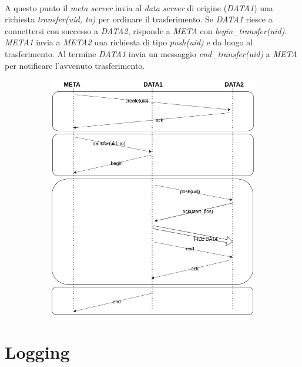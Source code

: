 \documentclass{article}
\begin{document}
\paragraph{} A questo punto il \emph{meta server} invia al \emph{data server} di origine (\emph{DATA1}) una richiesta \emph{transfer(uid, to)} per ordinare il trasferimento. Se \emph{DATA1} riesce a connettersi con successo a \emph{DATA2}, risponde a \emph{META} con \emph{begin\_transfer(uid)}. \emph{META1} invia a \emph{META2} una richiesta di tipo \emph{push(uid)} e da luogo al trasferimento. Al termine \emph{DATA1} invia un messaggio \emph{end\_transfer(uid)} a \emph{META} per notificare l'avvenuto trasferimento.


\begin{figure}[H]
	\centering
	\begin{subfigure}{0.80\linewidth}
		\includegraphics[width=\linewidth]{../diagrams/requests/transfer_request.png}
	\end{subfigure}
\end{figure}



\section{Logging}
\end{document}
